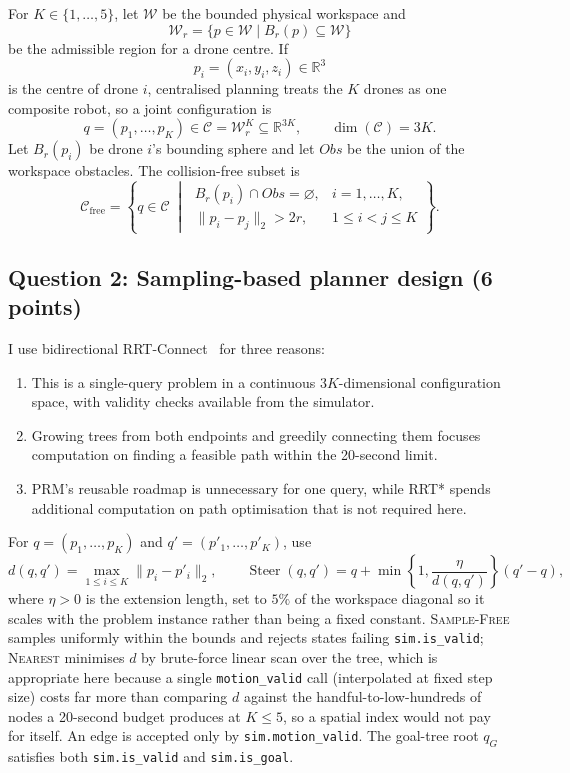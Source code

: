 \documentclass[11pt,a4paper]{article}
\begin{document}
For $K\in\{1,\ldots,5\}$, let $\mathcal W$ be the bounded physical
workspace and
\[
  \mathcal W_r=\{p\in\mathcal W\mid B_r(p)\subseteq\mathcal W\}
\]
be the admissible region for a drone centre.  If
\[
  p_i=(x_i,y_i,z_i)\in\mathbb R^3
\]
is the centre of drone $i$, centralised planning treats the $K$ drones as one
composite robot, so a joint configuration is
\[
  q=(p_1,\ldots,p_K)
  \in\mathcal C=\mathcal W_r^K\subseteq\mathbb R^{3K},
  \qquad
  \boxed{\dim(\mathcal C)=3K}.
\]
Let $B_r(p_i)$ be drone $i$'s bounding sphere and let $Obs$ be the union of
the workspace obstacles.  The collision-free subset is
\[
  \mathcal C_{\mathrm{free}}
  =
  \left\{
    q\in\mathcal C
    \;\middle|\;
    \begin{array}{ll}
      B_r(p_i)\cap Obs=\varnothing,
        & i=1,\ldots,K,\\
      \|p_i-p_j\|_2>2r,
        & 1\leq i<j\leq K
    \end{array}
  \right\}.
\]

\subsection*{Question 2: Sampling-based planner design (6 points)}

I use bidirectional RRT-Connect~\cite{rrtconnect} for three reasons:
\begin{enumerate}[label=(\arabic*),nosep]
  \item This is a single-query problem in a continuous $3K$-dimensional
        configuration space, with validity checks available from the simulator.
  \item Growing trees from both endpoints and greedily connecting them focuses
        computation on finding a feasible path within the 20-second limit.
  \item PRM's reusable roadmap is unnecessary for one query, while RRT* spends
        additional computation on path optimisation that is not required here.
\end{enumerate}
For $q=(p_1,\ldots,p_K)$ and $q'=(p'_1,\ldots,p'_K)$, use
\[
  d(q,q')=\max_{1\leq i\leq K}\|p_i-p'_i\|_2,
  \qquad
  \operatorname{Steer}(q,q')=q+
  \min\left\{1,\frac{\eta}{d(q,q')}\right\}(q'-q),
\]
where $\eta>0$ is the extension length, set to $5\%$ of the workspace
diagonal so it scales with the problem instance rather than being a fixed
constant.  \textsc{Sample-Free} samples uniformly within the bounds and
rejects states failing \texttt{sim.is\_valid};
\textsc{Nearest} minimises $d$ by brute-force linear scan over the tree,
which is appropriate here because a single \texttt{motion\_valid} call
(interpolated at fixed step size) costs far more than comparing $d$ against
the handful-to-low-hundreds of nodes a 20-second budget produces at
$K\leq5$, so a spatial index would not pay for itself.  An edge is accepted
only by \texttt{sim.motion\_valid}.  The goal-tree root $q_G$ satisfies both
\texttt{sim.is\_valid} and \texttt{sim.is\_goal}.
\end{document}
